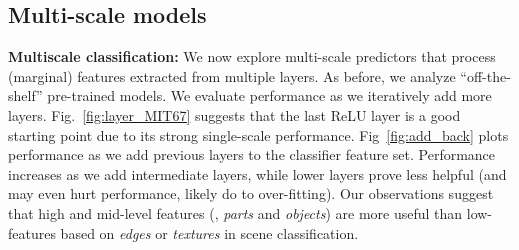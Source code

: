 \documentclass[10pt,twocolumn,letterpaper]{article}
\begin{document}
\subsection{Multi-scale models} 

{\bf Multiscale classification:} We now explore multi-scale predictors that process (marginal) features extracted from multiple layers. As before, we analyze ``off-the-shelf'' pre-trained models. We evaluate performance as we iteratively add more layers. Fig.~\ref{fig:layer_MIT67} suggests that the last ReLU layer is a good starting point due to its strong single-scale performance. Fig~\ref{fig:add_back} plots performance as we add previous layers to the classifier feature set. Performance increases as we add intermediate layers, while lower layers prove less helpful (and may even hurt performance, likely do to over-fitting). Our observations suggest that high and mid-level features (\ie, \textit{parts} and \textit{objects}) are more useful than low-features based on \textit{edges} or \textit{textures} in scene classification. 




\end{document}
